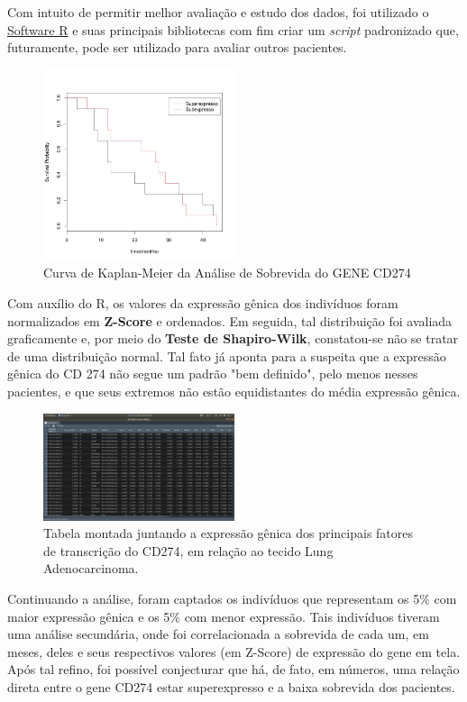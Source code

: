 \documentclass[a4paper,12pt]{article}
\begin{document}
Com intuito de permitir melhor avaliação e estudo dos dados, foi utilizado o \href{https://www.r-project.org/}{Software R} e suas principais bibliotecas com fim criar um \textit{script} padronizado que, futuramente, pode ser utilizado para avaliar outros pacientes.

\begin{figure}[h!]
\centering
\includegraphics[width=0.5\textwidth]{plot_AnaliseSobrevida.jpeg}
\caption{Curva de Kaplan-Meier da Análise de Sobrevida do GENE CD274}
\label{fig:TesteNorm}
\end{figure}

Com auxílio do R, os valores da expressão gênica dos indivíduos foram normalizados em \textbf{Z-Score} e ordenados. Em seguida, tal distribuição foi avaliada graficamente e, por meio do \textbf{Teste de Shapiro-Wilk}, constatou-se não se tratar de uma distribuição normal. Tal fato já aponta para a suspeita que a expressão gênica do CD 274 não segue um padrão "bem definido", pelo menos nesses pacientes, e que seus extremos não estão equidistantes do média expressão gênica.

\begin{figure}[h!]
\centering
\includegraphics[width=0.5\textwidth]{LungExpGen.png}
\caption{Tabela montada juntando a expressão gênica dos principais fatores de transcrição do CD274, em relação ao tecido Lung Adenocarcinoma.}
\label{fig:TesteNorm}
\end{figure}

Continuando a análise, foram captados os indivíduos que representam os 5\% com maior expressão gênica e os 5\% com menor expressão. Tais indivíduos tiveram uma análise secundária, onde foi correlacionada a sobrevida de cada um, em meses, deles e seus respectivos valores (em Z-Score) de expressão do gene em tela. Após tal refino, foi possível conjecturar que há, de fato, em números, uma relação direta entre o gene CD274 estar superexpresso e a baixa sobrevida dos pacientes.
\end{document}
